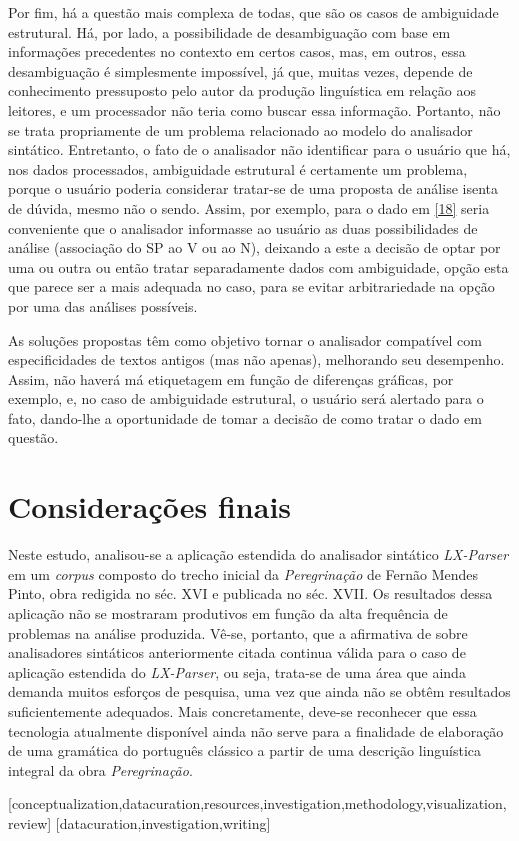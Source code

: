 \documentclass[portuguese]{textolivre}
\begin{document}
Por fim, há a questão mais complexa de todas, que são os casos de ambiguidade estrutural. Há, por lado, a possibilidade de desambiguação com base em informações precedentes no contexto em certos casos, mas, em outros, essa desambiguação é simplesmente impossível, já que, muitas vezes, depende de conhecimento pressuposto pelo autor da produção linguística em relação aos leitores, e um processador não teria como buscar essa informação. Portanto, não se trata propriamente de um problema relacionado ao modelo do analisador sintático. Entretanto, o fato de o analisador não identificar para o usuário que há, nos dados processados, ambiguidade estrutural é certamente um problema, porque o usuário poderia considerar tratar-se de uma proposta de análise isenta de dúvida, mesmo não o sendo. Assim, por exemplo, para o dado em \ref{18} seria conveniente que o analisador informasse ao usuário as duas possibilidades de análise (associação do SP ao V ou ao N), deixando a este a decisão de optar por uma ou outra ou então tratar separadamente dados com ambiguidade, opção esta que parece ser a mais adequada no caso, para se evitar arbitrariedade na opção por uma das análises possíveis.

As soluções propostas têm como objetivo tornar o analisador compatível com especificidades de textos antigos (mas não apenas), melhorando seu desempenho. Assim, não haverá má etiquetagem em função de diferenças gráficas, por exemplo, e, no caso de ambiguidade estrutural, o usuário será alertado para o fato, dando-lhe a oportunidade de tomar a decisão de como tratar o dado em questão.

\section{Considerações finais}

Neste estudo, analisou-se a aplicação estendida do analisador sintático \textit{LX-Parser} em um \textit{corpus} composto do trecho inicial da \textit{Peregrinação} de Fernão Mendes Pinto, obra redigida no séc. XVI e publicada no séc. XVII. Os resultados dessa aplicação não se mostraram produtivos em função da alta frequência de problemas na análise produzida. Vê-se, portanto, que a afirmativa de \textcite{alencar_utilizacao_2011} sobre analisadores sintáticos anteriormente citada continua válida para o caso de aplicação estendida do \textit{LX-Parser}, ou seja, trata-se de uma área que ainda demanda muitos esforços de pesquisa, uma vez que ainda não se obtêm resultados suficientemente adequados. Mais concretamente, deve-se reconhecer que essa tecnologia atualmente disponível ainda não serve para a finalidade de elaboração de uma gramática do português clássico a partir de uma descrição linguística integral da obra \textit{Peregrinação}.

\printbibliography\label{sec-bib}

\begin{contributors}
[conceptualization,datacuration,resources,investigation,methodology,visualization,review]
[datacuration,investigation,writing]
\end{contributors}
\end{document}
